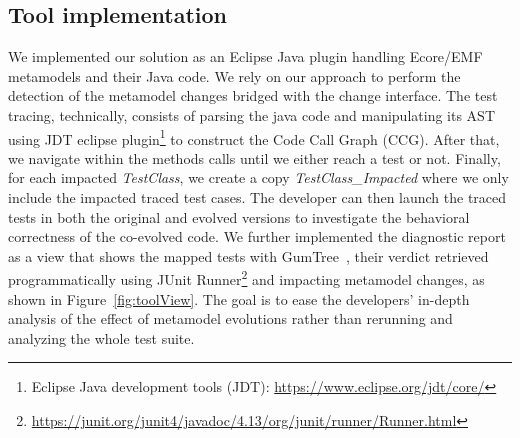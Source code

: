 



\subsection{Tool implementation}

We implemented our solution as an Eclipse Java plugin handling Ecore/EMF metamodels and their Java code. %
We rely on our approach \cite{khelladi2015detecting} to perform the detection of the metamodel changes bridged with the change interface. 
The test tracing, technically, consists of parsing the java code and manipulating its AST using JDT eclipse plugin\footnote{Eclipse Java development tools (JDT): \url{https://www.eclipse.org/jdt/core/}} to construct the Code Call Graph (CCG). After that, we navigate within the methods calls until we either reach a test or not. Finally, for each impacted \emph{TestClass}, we create a copy \emph{TestClass\_Impacted} where we only include the impacted traced test cases. The developer can then launch the traced tests in both the original and evolved versions to investigate the behavioral correctness of the co-evolved code. 
%
We further implemented the diagnostic report as a view that shows the mapped tests with GumTree~\cite{falleri2014fine}, their verdict retrieved programmatically using JUnit Runner\footnote{\url{https://junit.org/junit4/javadoc/4.13/org/junit/runner/Runner.html}} and impacting metamodel changes, as shown in Figure~\ref{fig:toolView}. The goal is to ease the developers' in-depth analysis of the effect of metamodel evolutions rather than rerunning and analyzing the whole test suite.

